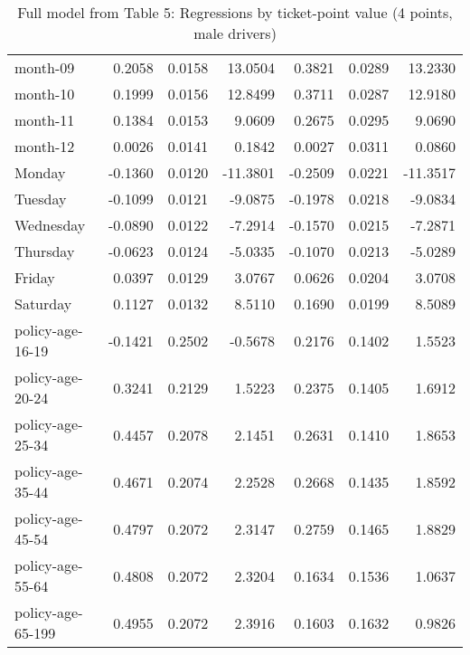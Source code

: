 \documentclass[10pt]{article}
\begin{document}
\begin{table}[ht]
\begin{tabular}{lrrrrrr}
  month-09 & 0.2058 & 0.0158 & 13.0504 & 0.3821 & 0.0289 & 13.2330 \\ 
  month-10 & 0.1999 & 0.0156 & 12.8499 & 0.3711 & 0.0287 & 12.9180 \\ 
  month-11 & 0.1384 & 0.0153 & 9.0609 & 0.2675 & 0.0295 & 9.0690 \\ 
  month-12 & 0.0026 & 0.0141 & 0.1842 & 0.0027 & 0.0311 & 0.0860 \\ 
  Monday & -0.1360 & 0.0120 & -11.3801 & -0.2509 & 0.0221 & -11.3517 \\ 
  Tuesday & -0.1099 & 0.0121 & -9.0875 & -0.1978 & 0.0218 & -9.0834 \\ 
  Wednesday & -0.0890 & 0.0122 & -7.2914 & -0.1570 & 0.0215 & -7.2871 \\ 
  Thursday & -0.0623 & 0.0124 & -5.0335 & -0.1070 & 0.0213 & -5.0289 \\ 
  Friday & 0.0397 & 0.0129 & 3.0767 & 0.0626 & 0.0204 & 3.0708 \\ 
  Saturday & 0.1127 & 0.0132 & 8.5110 & 0.1690 & 0.0199 & 8.5089 \\ 
  policy-age-16-19 & -0.1421 & 0.2502 & -0.5678 & 0.2176 & 0.1402 & 1.5523 \\ 
  policy-age-20-24 & 0.3241 & 0.2129 & 1.5223 & 0.2375 & 0.1405 & 1.6912 \\ 
  policy-age-25-34 & 0.4457 & 0.2078 & 2.1451 & 0.2631 & 0.1410 & 1.8653 \\ 
  policy-age-35-44 & 0.4671 & 0.2074 & 2.2528 & 0.2668 & 0.1435 & 1.8592 \\ 
  policy-age-45-54 & 0.4797 & 0.2072 & 2.3147 & 0.2759 & 0.1465 & 1.8829 \\ 
  policy-age-55-64 & 0.4808 & 0.2072 & 2.3204 & 0.1634 & 0.1536 & 1.0637 \\ 
  policy-age-65-199 & 0.4955 & 0.2072 & 2.3916 & 0.1603 & 0.1632 & 0.9826 \\ 
   \hline
\end{tabular}
\caption{Full model from Table 5: Regressions by ticket-point value (4 points, male drivers)} 
\label{tab_5_4_pts_M}
\end{table}


\clearpage
\pagebreak



\end{document}
